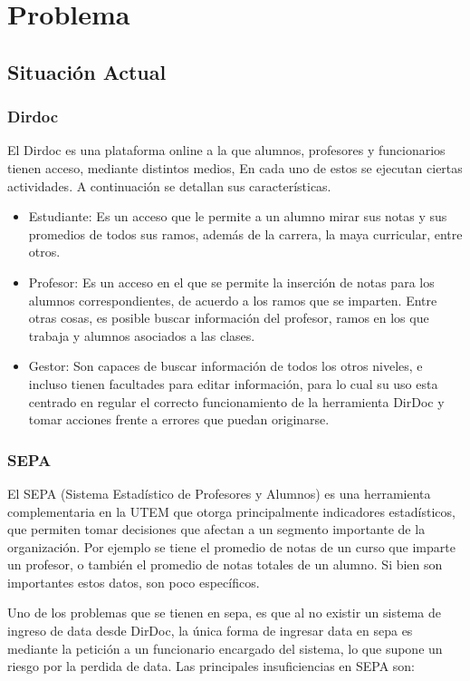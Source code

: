\documentclass[a4paper,12pt,openany,oneside]{book}
\begin{document}
\chapter{Problema}
\thispagestyle{empty}
\section{Situación Actual}
\subsection{Dirdoc}
El Dirdoc es una plataforma online a la que alumnos, profesores y funcionarios tienen acceso, mediante distintos medios, En cada uno de estos se ejecutan ciertas actividades. A continuación se detallan sus características.

\begin{itemize}
	\item Estudiante: Es un acceso que le permite a un alumno mirar sus notas y sus promedios de todos sus ramos, además de la carrera, la maya curricular, entre otros.
	\item Profesor: Es un acceso en el que se permite la inserción de notas para los alumnos correspondientes, de acuerdo a los ramos que se imparten. Entre otras cosas, es posible buscar información del profesor, ramos en los que trabaja y alumnos asociados a las clases.
	\item Gestor: Son capaces de buscar información de todos los otros niveles, e incluso tienen facultades para editar información, para lo cual su uso esta centrado en regular el correcto funcionamiento de la herramienta DirDoc y tomar acciones frente a errores que puedan originarse.
\end{itemize}

\subsection{SEPA}
El SEPA (Sistema Estadístico de Profesores y Alumnos) es una herramienta complementaria en la UTEM que otorga principalmente indicadores estadísticos, que permiten tomar decisiones que afectan a un segmento importante de la organización. Por ejemplo se tiene el promedio de notas de un curso que imparte un profesor, o también el promedio de notas totales de un alumno. Si bien son importantes estos datos, son poco específicos.

Uno de los problemas que se tienen en sepa, es que al no existir un sistema de ingreso de data desde DirDoc, la única forma de ingresar data en sepa es mediante la petición a un funcionario encargado del sistema, lo que supone un riesgo por la perdida de data. Las principales insuficiencias en SEPA son:
\end{document}
